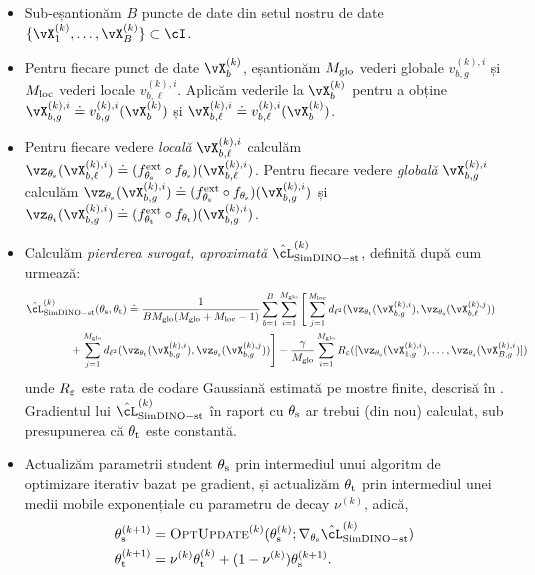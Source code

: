 \documentclass[../../book-main_ro.tex]{subfiles}
\begin{document}
\begin{itemize}
    \item Sub-eșantionăm \(B\) puncte de date din setul nostru de date \(\{\vX_{1}^{(k)}, \dots, \vX_{B}^{(k)}\} \subset \cI\).
    \item Pentru fiecare punct de date \(\vX_{b}^{(k)}\), eșantionăm \(M_{\mathrm{glo}}\) vederi globale \(v_{b, g}^{(k), i}\) și \(M_{\mathrm{loc}}\) vederi locale \(v_{b, \ell}^{(k), i}\). Aplicăm vederile la \(\vX_{b}^{(k)}\) pentru a obține \(\vX_{b, g}^{(k), i} \doteq v_{b, g}^{(k), i}(\vX_{b}^{(k)})\) și \(\vX_{b, \ell}^{(k), i} \doteq v_{b, \ell}^{(k), i}(\vX_{b}^{(k)})\).
    \item Pentru fiecare vedere \textit{locală} \(\vX_{b, \ell}^{(k), i}\) calculăm \(\vz_{\theta_{\student}}(\vX_{b, \ell}^{(k), i}) \doteq (f_{\theta_{\student}}^{\ext} \circ f_{\theta_{\student}})(\vX_{b, \ell}^{(k), i})\). Pentru fiecare vedere \textit{globală} \(\vX_{b, g}^{(k), i}\) calculăm \(\vz_{\theta_{\student}}(\vX_{b, g}^{(k), i}) \doteq (f_{\theta_{\student}}^{\ext} \circ f_{\theta_{\student}})(\vX_{b, g}^{(k), i})\) și \(\vz_{\theta_{\teacher}}(\vX_{b, g}^{(k), i}) \doteq (f_{\theta_{\teacher}}^{\ext} \circ f_{\theta_{\teacher}})(\vX_{b, g}^{(k), i})\).
    \item Calculăm \textit{pierderea surogat, aproximată} \(\hat{\cL}_{\simdino-\student\teacher}^{(k)}\), definită după cum urmează: 
    \begin{align}\label{eq:simdino_loss_teacherstudent_empirical}
        &\hat{\cL}_{\simdino{}-\student\teacher}^{(k)}(\theta_{\student}, \theta_{\teacher}) \doteq
        \frac{1}{BM_{\glo}(M_{\glo} + M_{\loc} - 1)}\sum_{b = 1}^{B}\sum_{i = 1}^{M_{\glo}}\Bigg[\sum_{j = 1}^{M_{\loc}}d_{\ell^{2}}(\vz_{\theta_{\teacher}}(\vX_{b, g}^{(k), i}), \vz_{\theta_{\student}}(\vX_{b, \ell}^{(k), j})) \\ 
        &\qquad \qquad + \sum_{j = 1}^{M_{\glo}}d_{\ell^{2}}(\vz_{\theta_{\teacher}}(\vX_{b, g}^{(k), i}), \vz_{\theta_{\student}}(\vX_{b, g}^{(k), j}))\Bigg] - \frac{\gamma}{M_{\glo}}\sum_{i = 1}^{M_{\glo}}R_{\eps}([\vz_{\theta_{\student}}(\vX_{1, g}^{(k), i}), \dots, \vz_{\theta_{\student}}(\vX_{B, g}^{(k), i})])\nonumber
    \end{align}
    unde \(R_{\varepsilon}\) este rata de codare Gaussiană estimată pe mostre finite, descrisă în . Gradientul lui \(\hat{\cL}_{\simdino-\student\teacher}^{(k)}\) în raport cu \(\theta_{\mathrm{s}}\) ar trebui (din nou) calculat, sub presupunerea că \(\theta_{\mathrm{t}}\) este constantă.
    \item Actualizăm parametrii student \(\theta_{\mathrm{s}}\) prin intermediul unui algoritm de optimizare iterativ bazat pe gradient, și actualizăm \(\theta_{\mathrm{t}}\) prin intermediul unei medii mobile exponențiale cu parametru de decay \(\nu^{(k)}\), adică, 
    \begin{align}
        \theta_{\student}^{(k + 1)}
        &= \textsc{OptUpdate}^{(k)}(\theta_{\student}^{(k)}; \nabla_{\theta_{\student}}\hat{\cL}_{\simdino-\student\teacher}^{(k)}) \\
        \theta_{\teacher}^{(k + 1)}
        &= \nu^{(k)}\theta_{\teacher}^{(k)} + (1 - \nu^{(k)})\theta_{\student}^{(k + 1)}.
    \end{align}
\end{itemize}
\end{document}
